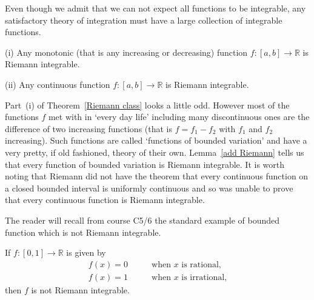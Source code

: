 Even though we admit that we can not expect all functions
to be integrable, any satisfactory theory of integration
must have a large collection of integrable functions.
\begin{theorem}\label{Riemann class}
(i) Any monotonic (that is any increasing
or decreasing) function $f:[a,b]\rightarrow{\mathbb R}$
is Riemann integrable.

(ii) Any continuous function $f:[a,b]\rightarrow{\mathbb R}$
is Riemann integrable.
\end{theorem}
Part~(i) of Theorem~\ref{Riemann class} looks a little
odd. However most of the functions $f$ met with in `every day
life' including many discontinuous ones
are the difference of two increasing functions
(that is $f=f_{1}-f_{2}$ with $f_{1}$ and $f_{2}$ 
increasing). Such functions are called `functions of
bounded variation' and have a very pretty,
if old fashioned, theory of their own.
Lemma~\ref{add  Riemann} tells us that every
function of bounded variation is  Riemann 
integrable. It is worth noting that
Riemann did not have the theorem that every
continuous function on a closed bounded interval
is uniformly continuous and so was unable to
prove that every continuous function
is Riemann integrable.

The reader will recall from course C5/6 the standard
example of bounded function which is not Riemann
integrable.
\begin{example} If $f:[0,1]\rightarrow{\mathbb R}$ is
given by
\begin{align*} 
f(x)=0&\qquad\text{when $x$ is rational,}\\
f(x)=1&\qquad\text{when $x$ is irrational,}
\end{align*}
then $f$ is not Riemann integrable.
\end{example}

